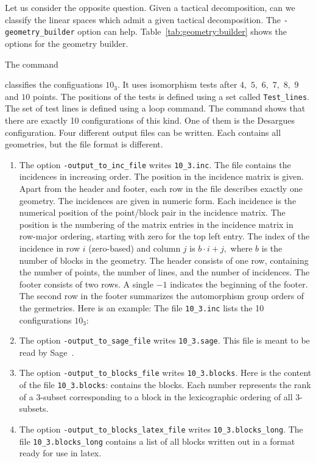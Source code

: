 Let us consider the opposite question. 
Given a tactical decomposition, 
can we classify the linear spaces which admit a given tactical decomposition.
The \verb'-geometry_builder' option can help. 
Table~\ref{tab:geometry:builder} shows the options for the geometry builder.


\bigskip

The command 


classifies the configuations $10_3$. 
It uses isomorphism tests after $4,$ $5,$ $6,$ $7,$ $8,$ $9$ and $10$ points.
The positions of the tests is defined using a set called \verb'Test_lines'. 
The set of test lines is defined using a loop command.
The command shows that 
there are exactly 10 configurations of this kind. 
One of them is the Desargues configuration. 
Four different output files can be written.
Each contains all geometries, but the file format is different.
\begin{enumerate}
\item
The option \verb'-output_to_inc_file'
writes \verb'10_3.inc'. 
The file contains the incidences in increasing order. 
The position in the incidence matrix is given.
Apart from the header and footer, each row in the file describes exactly one geometry.
The incidences are given in numeric form. 
Each incidence is the numerical position of the point/block pair in the 
incidence matrix. 
The position is the numbering of the matrix entries 
in the incidence matrix in row-major ordering, 
starting with zero for the top left entry. 
The index of the incidence in row $i$ (zero-based) 
and column $j$  is $b\cdot i + j,$ 
where $b$ is the number of blocks in the geometry.
The header consists of one row, containing the number of points, 
the number of lines, and the number of incidences.
The footer consists of two rows. 
A single $-1$ indicates the beginning of the footer.
The second row in the footer summarizes the automorphism group orders of the germetries.
Here is an example:
The file \verb'10_3.inc' lists the 10 configurations $10_3$:
\item
The option \verb'-output_to_sage_file'
writes \verb'10_3.sage'. 
This file is meant to be read by Sage~\cite{SteinJoyner2005}.
\item
The option \verb'-output_to_blocks_file'
writes \verb'10_3.blocks'. 
Here is the content of the file \verb'10_3.blocks':
contains the blocks. 
Each number represents the rank of a 3-subset corresponding to a block 
in the lexicographic ordering of all 3-subsets. 
\item
The option \verb'-output_to_blocks_latex_file'
writes \verb'10_3.blocks_long'. 
The file 
\verb'10_3.blocks_long' contains a list of all blocks 
written out in a format ready for use in latex.
\end{enumerate}


